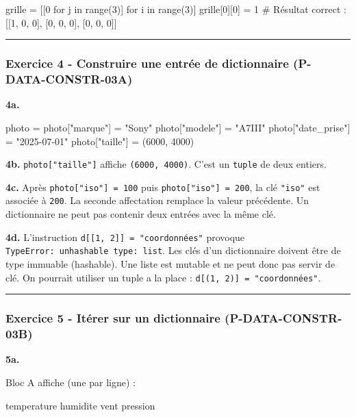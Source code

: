 \begin{python}
grille = [[0 for j in range(3)] for i in range(3)]
grille[0][0] = 1
# Résultat correct : [[1, 0, 0], [0, 0, 0], [0, 0, 0]]
\end{python}

\begin{center}\rule{0.5\linewidth}{0.5pt}\end{center}

\subsubsection{Exercice 4 - Construire une entrée de dictionnaire (P-DATA-CONSTR-03A)}

\textbf{4a.}

\begin{python}
photo = {}
photo["marque"] = "Sony"
photo["modele"] = "A7III"
photo["date_prise"] = "2025-07-01"
photo["taille"] = (6000, 4000)
\end{python}

\textbf{4b.} \texttt{photo{[}"taille"{]}} affiche
\texttt{(6000,\ 4000)}. C'est un \texttt{tuple} de deux entiers.

\textbf{4c.} Après \texttt{photo{[}"iso"{]}\ =\ 100} puis
\texttt{photo{[}"iso"{]}\ =\ 200}, la clé \texttt{"iso"} est associée à
\texttt{200}. La seconde affectation remplace la valeur précédente. Un
dictionnaire ne peut pas contenir deux entrées avec la même clé.

\textbf{4d.} L'instruction \texttt{d{[}{[}1,\ 2{]}{]}\ =\ "coordonnées"}
provoque
\texttt{TypeError:\ unhashable\ type:\ \textquotesingle{}list\textquotesingle{}}.
Les clés d'un dictionnaire doivent être de type immuable (hashable). Une
liste est mutable et ne peut donc pas servir de clé. On pourrait
utiliser un tuple a la place :
\texttt{d{[}(1,\ 2){]}\ =\ "coordonnées"}.

\begin{center}\rule{0.5\linewidth}{0.5pt}\end{center}

\subsubsection{Exercice 5 - Itérer sur un dictionnaire (P-DATA-CONSTR-03B)}

\textbf{5a.}

Bloc A affiche (une par ligne) :

\begin{python}
temperature
humidite
vent
pression
\end{python}

